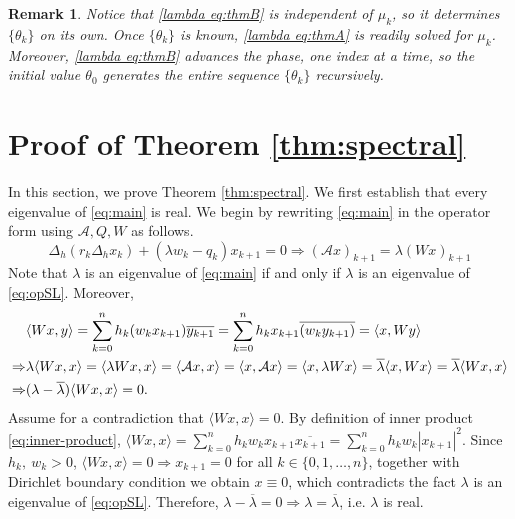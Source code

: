 \documentclass[12pt,reqno]{amsart}
\newtheorem{rem}[thm]{Remark}
\numberwithin{equation}{section}
\begin{document}
\begin{rem}
Notice that \eqref{lambda eq:thmB} is independent of $\mu_k$, so it determines
$\{\theta_k\}$ on its own. Once $\{\theta_k\}$ is known, \eqref{lambda eq:thmA} is
readily solved for $\mu_k$. Moreover, \eqref{lambda eq:thmB} advances the phase, one
index at a time, so the initial value $\theta_0$ generates the entire sequence
$\{\theta_k\}$ recursively.
\end{rem}
\section{Proof of Theorem \ref{thm:spectral}}
\label{sec:spectral}

In this section, we prove Theorem \ref{thm:spectral}. We first establish that every eigenvalue of \eqref{eq:main} is real. We begin by
rewriting \eqref{eq:main} in the operator form using $\mathcal{A}, Q, W$ as follows.
\begin{equation}
\label{eq:opSL}
\Delta_h(r_k\Delta_hx_k) + (\lambda w_k - q_k)x_{k+1}=0\Rightarrow (\mathcal{A}x)_{k+1}= \lambda(Wx)_{k+1}
\end{equation}
Note that $\lambda$ is an eigenvalue of \eqref{eq:main} if and only if $\lambda$ is an eigenvalue of \eqref{eq:opSL}. Moreover, 
\begin{align*}
& \langle Wx, y \rangle = \sum_{k=0}^{n}h_k(w_kx_{k+1})\overline{y_{k+1}}=\sum_{k=0}^{n}h_kx_{k+1}\overline{(w_ky_{k+1})}= \langle x, Wy \rangle \notag \\
 \Rightarrow & \lambda\langle Wx, x\rangle = \langle \lambda Wx, x\rangle= \langle \mathcal{A}x, x\rangle\notag= \langle x, \mathcal{A}x\rangle= \langle x, \lambda Wx\rangle= \overline{\lambda}\langle x, Wx\rangle=\overline{\lambda}\langle Wx, x\rangle\notag\\
\Rightarrow &(\lambda-\overline{\lambda})\langle Wx, x\rangle =0.
\end{align*}
Assume for a contradiction that $\langle Wx, x\rangle=0$. By definition of inner product \eqref{eq:inner-product}, $\langle Wx, x\rangle =\displaystyle\sum_{k=0}^{n} h_kw_kx_{k+1}\overline{x_{k+1}}=\displaystyle\sum_{k=0}^{n} h_kw_k|x_{k+1}|^2$. Since $h_k,~w_k >0$, $\langle Wx, x\rangle=0 \Rightarrow x_{k+1}=0$ for all $k \in \{0,1,\ldots,n\}$, together with Dirichlet boundary condition we obtain $x \equiv 0$, which contradicts the fact $\lambda $ is an eigenvalue of \eqref{eq:opSL}. Therefore, $\lambda-\overline{\lambda}=0 \Rightarrow \lambda = \overline{\lambda}$, i.e. $\lambda$ is real.
\end{document}

